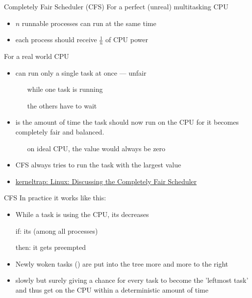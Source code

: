 \begin{frame}{Completely Fair Scheduler (CFS)}
  For a perfect (unreal) multitasking CPU
  \begin{itemize}
  \item $n$ runnable processes can run at the same time
  \item each process should receive $\frac{1}{n}$ of CPU power
  \end{itemize}
  
  For a real world CPU
  \begin{itemize}
  \item can run only a single task at once --- unfair
    \begin{itemize}
    \item[\Smiley] while one task is running
    \item[\Frowny\Frowny] the others have to wait
    \end{itemize}
  \item {} is the amount of time the task should now run on the CPU
    for it becomes completely fair and balanced.
    \begin{itemize}
    \item[\Smiley] on ideal CPU, the  value would always be zero
    \end{itemize}
  \item CFS always tries to run the task with the largest  value
  \end{itemize}
\end{frame}

\begin{itemize}
\item \href{http://kerneltrap.org/node/8208}{kerneltrap: Linux: Discussing the Completely
    Fair Scheduler}
\end{itemize}

\begin{frame}{CFS}
  In practice it works like this:
  \begin{itemize}
  \item While a task is using the CPU, its  decreases
    \begin{center}
    \end{center}
  \item[if:] its 
    (among all processes)
  \item[then:] it gets preempted
  \item Newly woken tasks () are put into the tree more and more
    to the right
  \item slowly but surely giving a chance for every task to become the 'leftmost task' and
    thus get on the CPU within a deterministic amount of time
  \end{itemize}
\end{frame}

